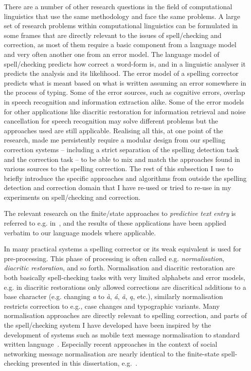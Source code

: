 \documentclass[officiallayout,final]{unihelcompling}
\begin{document}
There are a number of other research questions in the field of computational
linguistics that use the same methodology and face the same problems. A large
set of research problems within computational linguistics can be formulated in
some frames that are directly relevant to the issues of spell\-/checking and
correction, as most of them require a basic component from a language model and
very often another one from an error model. The language model of
spell\-/checking predicts how correct a word-form is, and in a linguistic
analyser it predicts the analysis and its likelihood. The error model of a
spelling corrector predicts what is meant based on what is written assuming an
error somewhere in the process of typing. Some of the error sources, such as
cognitive errors, overlap in speech recognition and information extraction
alike. Some of the error models for other applications like diacritic
restoration for information retrieval and noise cancellation for speech
recognition may solve different problems but the approaches used are still
applicable. Realising all this, at one point of the research, made me
persistently require a modular design from our spelling correction
systems -- including a strict separation of the spelling detection task and the
correction task -- to be able to mix and match the approaches found in various
sources to the spelling correction. The rest of this subsection I use to
briefly introduce the specific approaches and algorithms from outside the
spelling detection and correction domain that I have re-used or tried to
re-use in my experiments on spell\-/checking and correction.

The relevant research on the finite\-/state approaches to \emph{predictive text
entry} is referred to e.g. in~\citet{silfverberg2010partofspeech}, and the
results of these applications have been applied verbatim to our language models
where applicable.

In many practical systems a spelling corrector or its weak equivalent is used
for pre-processing. This phase of processing is often called e.g.
\emph{normalisation}, \emph{diacritic restoration}, and so forth. Normalisation
and diacritic restoration are both basically spell-checking tasks with very
limited alphabets and error models, e.g. in diacritic restorations only allowed
corrections are diacritical additions to a base character (e.g. changing
\emph{a} to \emph{à}, \emph{á}, \emph{ã}, \emph{ą}, etc.), similarly
normalisation restricts correction to e.g., case changes and typographic
variants.  Many normalisation approaches are directly relevant to spelling
correction, and parts of the spell\-/checking system I have developed have been
inspired by the development of systems such as mobile text message
normalisation to standard written language~\citep{kobus2008normalizing}.
Especially recent approaches in the context of social networking message
normalisation are nearly identical to the finite-state spell-checking presented
in this dissertation, e.g.~\citet{hulden2013weighted}.
\end{document}
